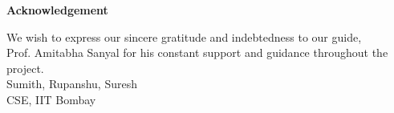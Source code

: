\begin{center}
{\large \bfseries
Acknowledgement
}~\\[1cm]
\end{center}
\begin{flushleft}
{
We wish to express our sincere gratitude and indebtedness to our guide, \\ Prof. Amitabha Sanyal for his constant support and guidance throughout the project. 
}~\\[1.5cm]
{
Sumith, Rupanshu, Suresh\\
CSE, IIT Bombay
}
\end{flushleft}
